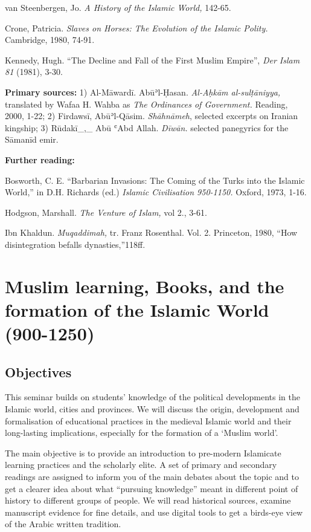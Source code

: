 \documentclass[
]{book}
\begin{document}
van Steenbergen, Jo. \emph{A History of the Islamic World,} 142-65.

Crone, Patricia. \emph{Slaves on Horses: The Evolution of the Islamic Polity.} Cambridge, 1980, 74-91.

Kennedy, Hugh. ``The Decline and Fall of the First Muslim Empire'', \emph{Der Islam 81} (1981), 3-30.

\textbf{Primary sources:} 1) Al-Māwardī. Abūʾl-Ḥasan. \emph{Al-Aḥkām al-sulṭāniyya,} translated by Wafaa H. Wahba as \emph{The Ordinances of Government.} Reading, 2000, 1-22; 2) Firdawsī, Abūʾl-Qāsim. \emph{Shāhnāmeh},
selected excerpts on Iranian kingship; 3) Rūdakī\_,\_ Abū ʿAbd Allah.
\emph{Dīwān.} selected panegyrics for the Sāmanīd emir.

\textbf{Further reading:}

Bosworth, C. E. ``Barbarian Invasions: The Coming of the Turks into the
Islamic World,'' in D.H. Richards (ed.) \emph{Islamic Civilisation 950-1150.}
Oxford, 1973, 1-16.

Hodgson, Marshall. \emph{The Venture of Islam,} vol 2., 3-61.

Ibn Khaldun. \emph{Muqaddimah,} tr. Franz Rosenthal. Vol. 2. Princeton, 1980,
``How disintegration befalls dynasties,''118ff.

\hypertarget{muslim-learning-books-and-the-formation-of-the-islamic-world-900-1250}{%
\chapter{Muslim learning, Books, and the formation of the Islamic World (900-1250)}\label{muslim-learning-books-and-the-formation-of-the-islamic-world-900-1250}}

\hypertarget{objectives}{%
\section{Objectives}\label{objectives}}

This seminar builds on students' knowledge of the political developments in the Islamic world, cities and provinces. We will discuss the origin, development and formalisation of educational practices in the medieval Islamic world and their long-lasting implications, especially for the formation of a `Muslim world'.

The main objective is to provide an introduction to pre-modern Islamicate learning practices and the scholarly elite. A set of primary and secondary readings are assigned to inform you of the main debates about the topic and to get a clearer idea about what ``pursuing knowledge'' meant in different point of history to different groups of people. We will read historical sources, examine manuscript evidence for fine details, and use digital tools to get a birds-eye view of the Arabic written tradition.
\end{document}

